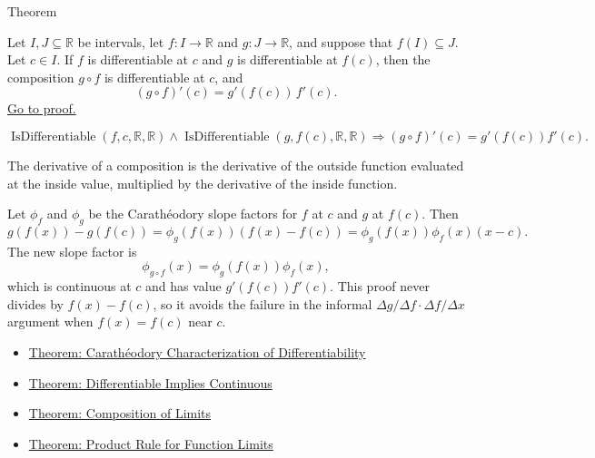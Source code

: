 
\begin{theorembox}{Theorem}
\begin{theorem}
\label{thm:chain-rule}
Let $I, J \subseteq \mathbb{R}$ be intervals, let $f : I \to \mathbb{R}$ and $g : J \to \mathbb{R}$, and suppose that $f(I) \subseteq J$. Let $c \in I$. If $f$ is differentiable at $c$ and $g$ is differentiable at $f(c)$, then the composition $g \circ f$ is differentiable at $c$, and
\[
(g \circ f)'(c) = g'(f(c))\,f'(c).
\]
\hyperref[prf:chain-rule]{Go to proof.}
\end{theorem}
\end{theorembox}

\begin{remark*}
\[
  \operatorname{IsDifferentiable}(f,c,\mathbb{R},\mathbb{R})
  \land
  \operatorname{IsDifferentiable}(g,f(c),\mathbb{R},\mathbb{R})
  \Longrightarrow
  (g\circ f)'(c)=g'(f(c))f'(c).
\]
\end{remark*}

\begin{remark*}[Interpretation]
The derivative of a composition is the derivative of the outside function evaluated at the inside value, multiplied by the derivative of the inside function.


Let $\phi_f$ and $\phi_g$ be the Carath\'{e}odory slope factors for $f$ at $c$
and $g$ at $f(c)$. Then
\[
g(f(x))-g(f(c))
  =
\phi_g(f(x))(f(x)-f(c))
  =
\phi_g(f(x))\phi_f(x)(x-c).
\]
The new slope factor is
\[
  \phi_{g\circ f}(x)=\phi_g(f(x))\phi_f(x),
\]
which is continuous at $c$ and has value $g'(f(c))f'(c)$. This proof never
divides by $f(x)-f(c)$, so it avoids the failure in the informal
$\Delta g/\Delta f \cdot \Delta f/\Delta x$ argument when $f(x)=f(c)$ near
$c$.
\end{remark*}

\begin{dependencies}
\begin{itemize}
  \item \hyperref[thm:caratheodory-characterization-of-differentiability]{Theorem: Carath\'{e}odory Characterization of Differentiability}
  \item \hyperref[thm:differentiable-implies-continuous]{Theorem: Differentiable Implies Continuous}
  \item \hyperref[thm:composition-of-limits]{Theorem: Composition of Limits}
  \item \hyperref[thm:limit-product]{Theorem: Product Rule for Function Limits}
\end{itemize}
\end{dependencies}

